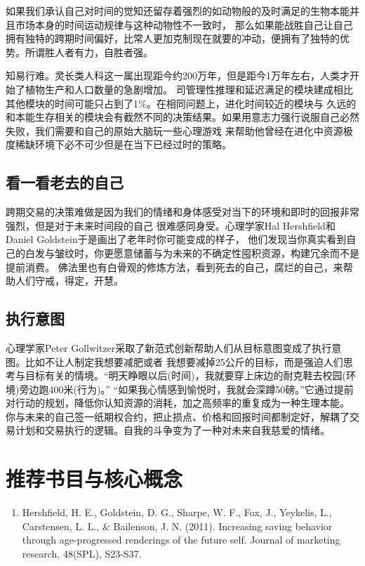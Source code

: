 \documentclass[
  oneside]{book}
\providecommand{\tightlist}{%
  \setlength{\itemsep}{0pt}\setlength{\parskip}{0pt}}
\begin{document}
如果我们承认自己对时间的觉知还留存着强烈的如动物般的及时满足的生物本能并且市场本身的时间运动规律与这种动物性不一致时，
那么如果能战胜自己让自己拥有独特的跨期时间偏好，比常人更加克制现在就要的冲动，便拥有了独特的优势。所谓胜人者有力，自胜者强。

知易行难。灵长类人科这一属出现距今约200万年，但是距今1万年左右，人类才开始了植物生产和人口数量的急剧增加。
司管理性推理和延迟满足的模块建成相比其他模块的时间可能只占到了1\%。在相同问题上，进化时间较近的模块与
久远的和本能生存相关的模块会有截然不同的决策结果。如果用意志力强行说服自己必然失败，我们需要和自己的原始大脑玩一些心理游戏
来帮助他曾经在进化中资源极度稀缺环境下必不可少但是在当下已经过时的策略。

\hypertarget{ux770bux4e00ux770bux8001ux53bbux7684ux81eaux5df1}{%
\subsection{看一看老去的自己}\label{ux770bux4e00ux770bux8001ux53bbux7684ux81eaux5df1}}

跨期交易的决策难做是因为我们的情绪和身体感受对当下的环境和即时的回报非常强烈，但是对于未来时间段的自己
很难感同身受。心理学家Hal Hershfield和Daniel Goldstein于是画出了老年时你可能变成的样子，
他们发现当你真实看到自己的白发与皱纹时，你更愿意储蓄与为未来的不确定性囤积资源，构建冗余而不是提前消费。
佛法里也有白骨观的修炼方法，看到死去的自己，腐烂的自己，来帮助人们守戒，得定，开慧。

\hypertarget{ux6267ux884cux610fux56fe}{%
\subsection{执行意图}\label{ux6267ux884cux610fux56fe}}

心理学家Peter Gollwitzer采取了新范式创新帮助人们从目标意图变成了执行意图。比如不让人制定我想要减肥或者
我想要减掉25公斤的目标，而是强迫人们思考与目标有关的情境。``明天睁眼以后(时间)，我就要穿上床边的耐克鞋去校园(环境)旁边跑400米(行为)。''
``如果我心情感到愉悦时，我就会深蹲50磅。''它通过提前对行动的规划，降低你认知资源的消耗，加之高频率的重复成为一种生理本能。
你与未来的自己签一纸期权合约，把止损点、价格和回报时间都制定好，解耦了交易计划和交易执行的逻辑。自我的斗争变为了一种对未来自我慈爱的情绪。

\hypertarget{ux63a8ux8350ux4e66ux76eeux4e0eux6838ux5fc3ux6982ux5ff5-2}{%
\section{推荐书目与核心概念}\label{ux63a8ux8350ux4e66ux76eeux4e0eux6838ux5fc3ux6982ux5ff5-2}}

\begin{enumerate}
\def\labelenumi{\arabic{enumi}.}
\tightlist
\item
  Hershfield, H. E., Goldstein, D. G., Sharpe, W. F., Fox, J., Yeykelis, L., Carstensen, L. L., \& Bailenson, J. N. (2011). Increasing saving behavior through age-progressed renderings of the future self. Journal of marketing research, 48(SPL), S23-S37.
\end{enumerate}

\printbibliography
\end{document}
